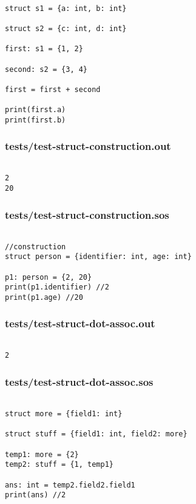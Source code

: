\documentclass[main.tex]{subfiles}
\begin{document}
\begin{lstlisting}

struct s1 = {a: int, b: int}

struct s2 = {c: int, d: int}

first: s1 = {1, 2}

second: s2 = {3, 4}

first = first + second

print(first.a)
print(first.b)
\end{lstlisting}

\subsubsection{tests/test-struct-construction.out}

\begin{lstlisting}

2
20
\end{lstlisting}

\subsubsection{tests/test-struct-construction.sos}

\begin{lstlisting}

//construction
struct person = {identifier: int, age: int}

p1: person = {2, 20}
print(p1.identifier) //2
print(p1.age) //20
\end{lstlisting}

\subsubsection{tests/test-struct-dot-assoc.out}

\begin{lstlisting}

2
\end{lstlisting}

\subsubsection{tests/test-struct-dot-assoc.sos}

\begin{lstlisting}

struct more = {field1: int}

struct stuff = {field1: int, field2: more}

temp1: more = {2}
temp2: stuff = {1, temp1}

ans: int = temp2.field2.field1
print(ans) //2
\end{lstlisting}
\end{document}
